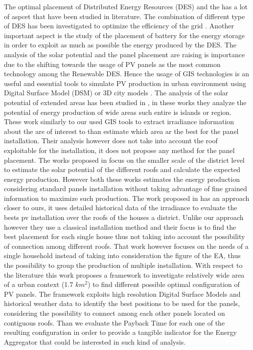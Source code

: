 The optimal placement of Distributed Energy Resources (DES) and the has a lot of aspcet that have been studied in literature. The combination of different type of DES has been investigated to optimize the efficiency of the grid \cite{masoum2010optimal}\cite{ondeck2015optimal}\cite{doagou2013optimal}. Another important aspect is the study of the placement of battery for the energy storage in order to exploit as much as possible the energy produced by the DES\cite{fortenbacher2017optimal}\cite{chedid2019optimal}.
The analysis of the solar potential and the panel placement are raising is importance due to the shifting towards the usage of PV panels as the most common technology among the Renewable DES. Hence the usage of GIS technologies is an useful and essential tools to simulate PV production in urban environment using Digital Surface Model (DSM) or 3D city models \cite{kucuksari2014integrated}\cite{pillot2020integrated}\cite{yushchenko2018gis}. The analysis of the solar potential of extended areas has been studied in \cite{baranyai2021correlation}\cite{khemiri2018optimal}\cite{bergamasco2011scalable}, in these works they analyze the potential of energy production of wide areas such entire is islands or region. These work similarly to our used GIS tools to extract irradiance information about the are of interest to than estimate which area ar the best for the panel installation. Their analysis however does not take into account the roof exploitable for the installation, it does not propose any method for the panel placement. The works proposed in \cite{kucuksari2014integrated}\cite{bracco2018energy} focus on the smaller scale of the district level to estimate the solar potential of the different roofs and calculate the expected energy production. However both these works estimates the energy production considering standard panels installation without taking advantage of fine grained information to maximize such production.
The work proposed in \cite{el2020optimal} has an approach closer to ours, it uses detailed historical data of the irradiance to evaluate the bests pv installation over the roofs of the houses a district. Unlike our approach however they use a classical installation method and their focus is to find the best placement for each single house thus not taking into account the possibility of connection among different roofs. That work however focuses on the needs of a single household instead of taking into consideration the figure of the EA, thus the possibility to group the production of multiple installation.
With respect to the literature this work proposes a framework to investigate relatively wide area of a urban context (1.7 $km^2$) to find different possible optimal configuration of PV panels. The framework exploits high resolution Digital Surface Models and historical weather data to identify the best positions to be used for the panels, considering the possibility to connect among each other panels located on contiguous roofs. Than we evaluate the Payback Time for each one of the resulting configuration in order to provide a tangible indicator for the Energy Aggregator that could be interested in such kind of analysis.